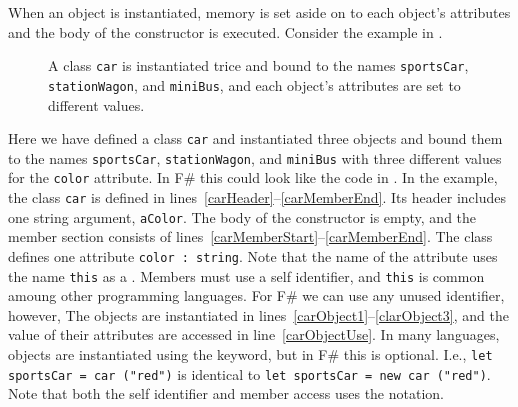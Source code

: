 When an object is instantiated, memory is set aside on  to each object's attributes and the body of the constructor is executed. Consider the example in .
\begin{figure}[h]
  \centering
  \caption{A class \lstinline{car} is instantiated trice and bound to the names \lstinline{sportsCar}, \lstinline{stationWagon}, and \lstinline{miniBus}, and each object's attributes are set to different values.}
  \label{fig:instantiation}
\end{figure}
Here we have defined a class \lstinline{car} and instantiated three objects and bound them to the names \lstinline{sportsCar}, \lstinline{stationWagon}, and \lstinline{miniBus} with three different values for the \lstinline{color} attribute. In F\# this could look like the code in .
%
%
%
In the example, the class \lstinline{car} is defined in lines~\ref{carHeader}--\ref{carMemberEnd}. Its header includes one string argument, \lstinline{aColor}. The body of the constructor is empty, and the member section consists of lines~\ref{carMemberStart}--\ref{carMemberEnd}. The class defines one attribute \lstinline{color : string}. Note that the name of the attribute uses the name \lstinline{this} as a . Members must use a self identifier, and \lstinline{this} is common amoung other programming languages. For F\# we can use any unused identifier, however,  The objects are instantiated in lines~\ref{carObject1}--\ref{clarObject3}, and the value of their attributes are accessed in line~\ref{carObjectUse}. In many languages, objects are instantiated using the  keyword, but in F\# this is optional. I.e., \lstinline{let sportsCar = car ("red")} is identical to \lstinline{let sportsCar = new car ("red")}. Note that both the self identifier and member access uses the  notation.

